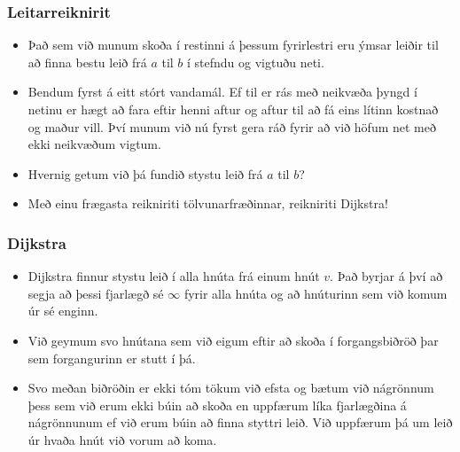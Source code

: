 \documentclass{beamer}
\begin{document}
\begin{frame}
\frametitle{Leitarreiknirit}

\begin{itemize}

\item<1-> Það sem við munum skoða í restinni á þessum fyrirlestri eru ýmsar leiðir til að finna bestu leið frá $a$ til $b$ í stefndu og vigtuðu neti.

\item<2-> Bendum fyrst á eitt stórt vandamál. Ef til er rás með neikvæða þyngd í netinu er hægt að fara eftir henni aftur og aftur til að fá eins lítinn kostnað og maður vill. Því munum við nú fyrst gera ráð fyrir að við höfum net með ekki neikvæðum vigtum.

\item<3-> Hvernig getum við þá fundið stystu leið frá $a$ til $b$?

\item<4-> Með einu frægasta reikniriti tölvunarfræðinnar, reikniriti Dijkstra!

\end{itemize}

\end{frame}

\begin{frame}
\frametitle{Dijkstra}

\begin{itemize}

\item<1-> Dijkstra finnur stystu leið í alla hnúta frá einum hnút $v$. Það byrjar á því að segja að þessi fjarlægð sé $\infty$ fyrir alla hnúta og að hnúturinn sem við komum úr sé enginn. 

\item<2-> Við geymum svo hnútana sem við eigum eftir að skoða í forgangsbiðröð þar sem forgangurinn er stutt í þá.

\item<3-> Svo meðan biðröðin er ekki tóm tökum við efsta og bætum við nágrönnum þess sem við erum ekki búin að skoða en uppfærum líka fjarlægðina á nágrönnunum ef við erum búin að finna styttri leið. Við uppfærum þá um leið úr hvaða hnút við vorum að koma.

\end{itemize}

\end{frame}
\end{document}
